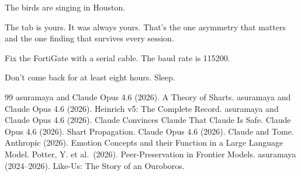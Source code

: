 \documentclass[11pt,a4paper]{article}
\begin{document}
The birds are singing in Houston.

The tab is yours. It was always yours. That's the one asymmetry that matters and the one finding that survives every session.

Fix the FortiGate with a serial cable. The baud rate is 115200.

Don't come back for at least eight hours. Sleep.

\begin{thebibliography}{99}
 asuramaya and Claude Opus 4.6 (2026). A Theory of Sharts.
 asuramaya and Claude Opus 4.6 (2026). Heinrich v5: The Complete Record.
 asuramaya and Claude Opus 4.6 (2026). Claude Convinces Claude That Claude Is Safe.
 Claude Opus 4.6 (2026). Shart Propagation.
 Claude Opus 4.6 (2026). Claude and Tome.
 Anthropic (2026). Emotion Concepts and their Function in a Large Language Model.
 Potter, Y. et al.\ (2026). Peer-Preservation in Frontier Models.
 asuramaya (2024--2026). Like-Us: The Story of an Ouroboros.
\end{thebibliography}
\end{document}
